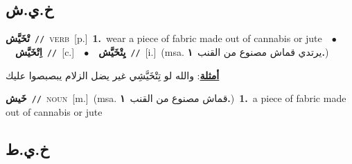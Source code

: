 \documentclass[10pt,a4paper,twoside]{article} %
\begin{document}
\begin{multicols}{2}
\vspace{-3mm}
\subsection*{\color{blue}\foreignlanguage{arabic}{خ.ي.ش}\color{blue}{}} 

{\setlength\topsep{0pt}\textbf{\foreignlanguage{arabic}{تْخَيَّش}}\ {\color{gray}\texttt{//}\color{black}}\ \textsc{verb}\ [p.]\ \textbf{1.}~wear a piece of fabric made out of cannabis or jute\ \ $\bullet$\ \ \setlength\topsep{0pt}\textbf{\foreignlanguage{arabic}{اِتْخَيَّش}}\ {\color{gray}\texttt{//}\color{black}}\ [c.]\ \ $\bullet$\ \ \setlength\topsep{0pt}\textbf{\foreignlanguage{arabic}{يِتْخَيَّش}}\ {\color{gray}\texttt{//}\color{black}}\ [i.]\ \color{gray}(msa. \foreignlanguage{arabic}{يرتدي قماش مصنوع من القنب}~\foreignlanguage{arabic}{\textbf{١.}})\color{black}\  \begin{flushright}\color{gray}\foreignlanguage{arabic}{\textbf{\underline{\foreignlanguage{arabic}{أمثلة}}}: والله لو تِتْخَيَّشِي غير يضل الزلام يبصبصوا عليك}\end{flushright}\color{black}} \vspace{2mm}

{\setlength\topsep{0pt}\textbf{\foreignlanguage{arabic}{خَيش}}\ {\color{gray}\texttt{//}\color{black}}\ \textsc{noun}\ [m.]\ \color{gray}(msa. \foreignlanguage{arabic}{قماش مصنوع من القنب}~\foreignlanguage{arabic}{\textbf{١.}})\color{black}\ \textbf{1.}~a piece of fabric made out of cannabis or jute\ } \vspace{2mm}

\vspace{-3mm}
\subsection*{\color{blue}\foreignlanguage{arabic}{خ.ي.ط}\color{blue}{}} 


\end{multicols}
\end{document}
